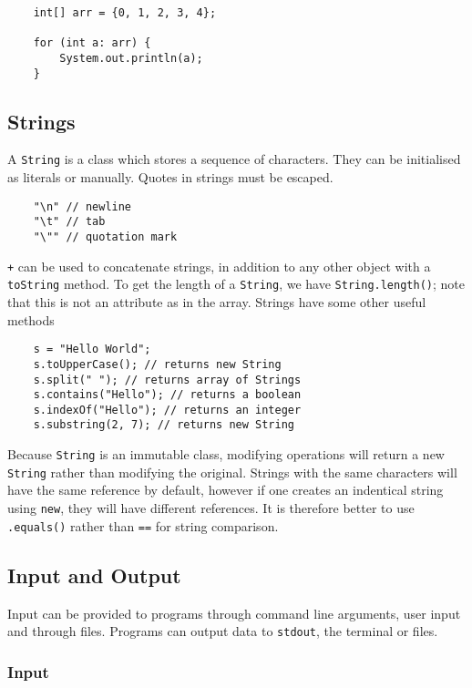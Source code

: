 \documentclass[12pt]{report}
\newcommand{\code}[1]{\lstinline{#1}}
\begin{document}
\begin{flushleft}
\begin{lstlisting}
    int[] arr = {0, 1, 2, 3, 4};

    for (int a: arr) {
        System.out.println(a);
    }
\end{lstlisting}

\subsection*{Strings}

A \code{String} is a class which stores a sequence of characters. They can
be initialised as literals or manually. Quotes in strings must be escaped.

\begin{lstlisting}
    "\n" // newline
    "\t" // tab
    "\"" // quotation mark
\end{lstlisting}

\code{+} can be used to concatenate strings, in addition to any other object
with a \code{toString} method. To get the length of a \code{String}, we have
\code{String.length()}; note that this is not an attribute as in the array.
Strings have some other useful methods

\begin{lstlisting}
    s = "Hello World";
    s.toUpperCase(); // returns new String
    s.split(" "); // returns array of Strings
    s.contains("Hello"); // returns a boolean 
    s.indexOf("Hello"); // returns an integer
    s.substring(2, 7); // returns new String
\end{lstlisting}

Because \code{String} is an immutable class, modifying operations will return
a new \code{String} rather than modifying the original. Strings with the same
characters will have the same reference by default, however if one creates an
indentical string using \code{new}, they will have different references. It is
therefore better to use \code{.equals()} rather than \code{==} for string 
comparison.

\subsection*{Input and Output}

Input can be provided to programs through command line arguments, user input
and through files. Programs can output data to \code{stdout}, the terminal or
files.

\subsubsection*{Input}


\end{flushleft}
\end{document}

